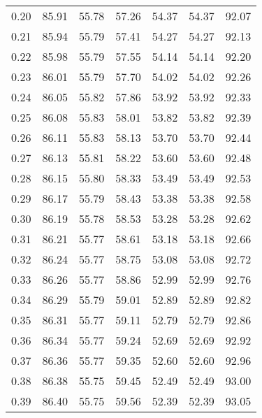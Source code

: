 \begin{tabular}{|c|c|c|c|c|c|c|}
      0.20 &     85.91 &     55.78 &      57.26 &   54.37 &      54.37 &         92.07 \\
      0.21 &     85.94 &     55.79 &      57.41 &   54.27 &      54.27 &         92.13 \\
      0.22 &     85.98 &     55.79 &      57.55 &   54.14 &      54.14 &         92.20 \\
      0.23 &     86.01 &     55.79 &      57.70 &   54.02 &      54.02 &         92.26 \\
      0.24 &     86.05 &     55.82 &      57.86 &   53.92 &      53.92 &         92.33 \\
      0.25 &     86.08 &     55.83 &      58.01 &   53.82 &      53.82 &         92.39 \\
      0.26 &     86.11 &     55.83 &      58.13 &   53.70 &      53.70 &         92.44 \\
      0.27 &     86.13 &     55.81 &      58.22 &   53.60 &      53.60 &         92.48 \\
      0.28 &     86.15 &     55.80 &      58.33 &   53.49 &      53.49 &         92.53 \\
      0.29 &     86.17 &     55.79 &      58.43 &   53.38 &      53.38 &         92.58 \\
      0.30 &     86.19 &     55.78 &      58.53 &   53.28 &      53.28 &         92.62 \\
      0.31 &     86.21 &     55.77 &      58.61 &   53.18 &      53.18 &         92.66 \\
      0.32 &     86.24 &     55.77 &      58.75 &   53.08 &      53.08 &         92.72 \\
      0.33 &     86.26 &     55.77 &      58.86 &   52.99 &      52.99 &         92.76 \\
      0.34 &     86.29 &     55.79 &      59.01 &   52.89 &      52.89 &         92.82 \\
      0.35 &     86.31 &     55.77 &      59.11 &   52.79 &      52.79 &         92.86 \\
      0.36 &     86.34 &     55.77 &      59.24 &   52.69 &      52.69 &         92.92 \\
      0.37 &     86.36 &     55.77 &      59.35 &   52.60 &      52.60 &         92.96 \\
      0.38 &     86.38 &     55.75 &      59.45 &   52.49 &      52.49 &         93.00 \\
      0.39 &     86.40 &     55.75 &      59.56 &   52.39 &      52.39 &         93.05 \\

\end{tabular}
